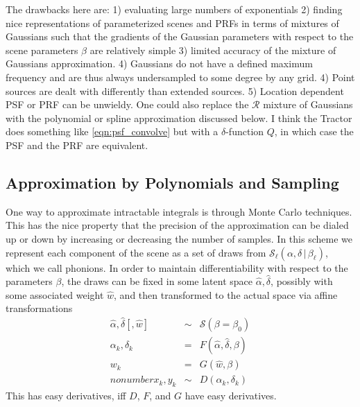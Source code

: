\documentclass[modern]{aastex6}
\newcommand{\given}{\,|\,}
\newcommand{\prf}{\mathcal{R}}
\newcommand{\qe}{Q}
\newcommand{\scene}{\mathcal{S}}
\begin{document}
The drawbacks here are:
   1) evaluating large numbers of exponentials
   2) finding nice representations of parameterized scenes and PRFs in terms of mixtures of Gaussians such that the gradients of the Gaussian parameters with respect to the scene parameters $\beta$ are relatively simple
   3) limited accuracy of the mixture of Gaussians approximation.
   4) Gaussians do not have a defined maximum frequency and are thus always undersampled to some degree by any grid.
   4) Point sources are dealt with differently than extended sources.
   5) Location dependent PSF or PRF can be unwieldy.
One could also replace the $\prf$ mixture of Gaussians with the polynomial or spline approximation discussed below.
I think the Tractor does something like \ref{eqn:psf_convolve} but with a $\delta$-function $\qe$, in which case the PSF and the PRF are equivalent.

\subsection{Approximation by Polynomials and Sampling}
One way to approximate intractable integrals is through Monte Carlo techniques.
This has the nice property that the precision of the approximation can be dialed up or down by increasing or decreasing the number of samples.
In this scheme we represent each component of the scene as a set of draws from $\scene_\ell(\alpha, \delta \given \beta_\ell)$, which we call phonions.
In order to maintain differentiability with respect to the parameters $\beta$, the draws can be fixed in some latent space $\hat{\alpha}, \hat{\delta}$,
possibly with some associated weight $\hat{w}$,
and then transformed to the actual space via affine transformations
\begin{eqnarray}
\hat{\alpha}, \hat{\delta} [, \hat{w}] & \sim & \scene(\beta=\beta_0) \\
\alpha_k, \delta_k & = & F(\hat{\alpha}, \hat{\delta}, \beta) \nonumber \\
w_k & = & G(\hat{w}, \beta) \\nonumber
x_k, y_k & \sim & D(\alpha_k, \delta_k) \nonumber
\end{eqnarray}
This has easy derivatives, iff $D$, $F$, and $G$ have easy derivatives.
\end{document}
